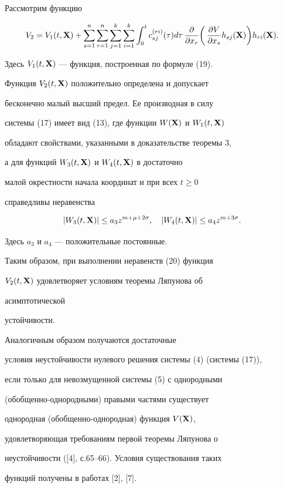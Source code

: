  


\begin{pf} Рассмотрим функцию 


$$ 


V_2=V_1(t,\bx)+\sum^n_{s=1}\sum^n_{r=1}\sum^k_{j=1}\sum^k_{i=1} 


\int^t_0 c^{(ri)}_{sj}(\tau)d\tau\, 


\frac{\partial}{\partial x_r}\biggl(\, 


\frac{\partial V}{\partial x_s}h_{sj}(\bx)\biggr)h_{ri}(\bx). 


$$ 


Здесь $V_1(t,\bold X)$ --- функция, построенная по формуле (19). 


Функция $V_2(t,\bold X)$ положительно определена и допускает 


бесконечно малый высший предел. Ее производная в силу 


системы (17) имеет вид (13), где функции $W(\bold X)$ и $W_1(t,\bold X)$ 


обладают свойствами, указанными в доказательстве теоремы 3, 


а для функций $W_3(t,\bold X)$ и $W_4(t,\bold X)$ в достаточно 


малой окрестности начала координат и при всех $t\ge 0$ 


справедливы неравенства 


$$ 


|W_3(t,\bx)|\le a_3 z^{m+\mu+2\sigma},\quad 


|W_4(t,\bx)|\le a_4 z^{m+3\sigma}. 


$$ 


Здесь $a_3$ и $a_4$ --- положительные постоянные. 


 


Таким образом, при выполнении неравенств (20) функция 


$V_2(t,\bold X)$ удовлетворяет условиям теоремы Ляпунова об 


асимптотической 


устойчивости. 


\end{pf} 


 


\begin{note} Аналогичным образом получаются достаточные 


условия неустойчивости нулевого решения системы (4) (системы (17)), 


если только для невозмущенной системы (5) с однородными 


(обобщенно-однородными) правыми частями существует 


однородная (обобщенно-однородная) функция $V(\bold X)$, 


удовлетворяющая требованиям первой теоремы Ляпунова о 


неустойчивости ([4], с.65--66). Условия существования таких 


функций получены в работах [2], [7]. 


\end{note} 


